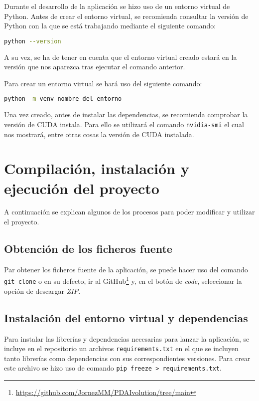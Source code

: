 Durante el desarrollo de la aplicación se hizo uso de un entorno virtual de Python. Antes de crear el entorno virtual, se recomienda consultar la versión de Python con la que se está trabajando mediante el siguiente comando:

\begin{lstlisting}[language=bash, caption={Comprobación de versión de Python}]
python --version
\end{lstlisting}

A su vez, se ha de tener en cuenta que el entorno virtual creado estará en la versión que nos aparezca tras ejecutar el comando anterior. 

Para crear un entorno virtual se hará uso del siguiente comando:

\begin{lstlisting}[language=bash, caption={Creación de un entorno virtual}]
python -m venv nombre_del_entorno
\end{lstlisting}

Una vez creado, antes de instalar las dependencias, se recomienda comprobar la versión de CUDA instala. Para ello se utilizará el comando \texttt{nvidia-smi} el cual nos mostrará, entre otras cosas la versión de CUDA instalada.


\section{Compilación, instalación y ejecución del proyecto}

A continuación se explican algunos de los procesos para poder modificar y utilizar el proyecto.

\subsection{Obtención de los ficheros fuente}

Par obtener los ficheros fuente de la aplicación, se puede hacer uso del comando \texttt{git clone} o en su defecto, ir al GitHub\footnote{\url{https://github.com/JornezMM/PDAIvolution/tree/main}} y, en el botón de \textit{code}, seleccionar la opción de descargar \textit{ZIP}.

\subsection{Instalación del entorno virtual y dependencias}

Para instalar las librerías y dependencias necesarias para lanzar la aplicación, se incluye en el repositorio un archivos \texttt{requirements.txt} en el que se incluyen tanto librerías como dependencias con sus correspondientes versiones. Para crear este archivo se hizo uso de comando \texttt{pip freeze > requirements.txt}.


